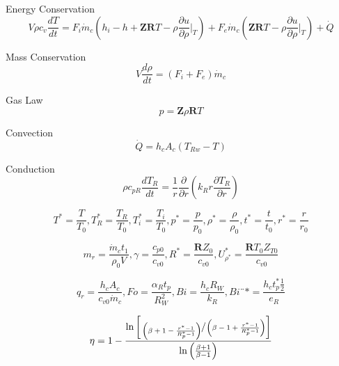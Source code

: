 \documentclass{article}
\begin{document}

Energy Conservation 
\begin{equation} V\rho c_v \frac{dT}{dt} =F_i \dot{m}_c \left( h_i - h + \textbf{ZR}T - \rho\frac{\partial u}{\partial \rho}\bigg|_{T}\right) + F_e \dot{m}_c \left( \textbf{ZR}T - \rho\frac{\partial u}{\partial \rho}\bigg|_{T}\right) + \dot{Q}  \end{equation} 

Mass Conservation \begin{equation} V \frac{d\rho}{dt} = \left(F_i+F_e \right) \dot{m}_c \end{equation}

Gas Law \begin{equation} p=\textbf{Z}\rho \textbf{R}T \end{equation}

Convection \begin{equation} \dot{Q} = h_cA_c \left(T_{Rw} -T \right) \end{equation}

Conduction \begin{equation} \rho c_{pR}\frac{dT_R}{dt}= \frac{1}{r} \frac{\partial}{\partial r}\left(k_Rr \frac{\partial T_R}{\partial r} \right)  \end{equation}


$$ T^* = \frac{T}{T_0},   T_R^*=\frac{T_R}{T_0}, T_i^* =\frac{T_i}{T_0}, p^* = \frac{p}{p_0}, \rho^* = \frac{\rho}{\rho_0},  t^* = \frac{t}{t_0}, r^* = \frac{r}{r_0} $$

$$ m_r=\frac{\dot{m}_ct_1}{\rho_0 V}, \gamma = \frac{c_{p0}}{c_{v0}},  R^*= \frac{\textbf{R}Z_0}{c_{v0}}, U_{\rho^*}^* = \frac{\textbf{R}T_0Z_{T0}}{c_{v0}} $$

$$ q_r = \frac{h_cA_c}{c_{v0}\dot{m}_c}, Fo = \frac{\alpha_Rt_p}{R_W^2}, Bi = \frac{h_cR_W}{k_R},
Bi¨* = \frac{h_ct_p^*{\frac{1}{2}}}{e_R}$$

\begin{equation}\eta  = 1 -   \frac  {\ln\left[\sfrac{\left(\beta+1-\frac{r^*-1}{R_p^*-1}\right)}{\left(\beta-1+\frac{r^*-1}{R_p^*-1}\right)}\right]} 
  {\ln\left({\frac{\beta+1}{\beta-1}}\right)}\end{equation}

\end{document}
